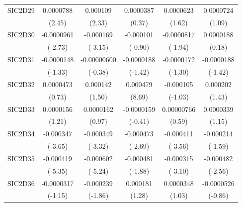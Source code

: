 \begin{table}[htbp]
\begin{tabular}{l*{5}{c}}
SIC2D29     &   0.0000788\sym{*}  &    0.000109\sym{*}  &   0.0000387         &   0.0000623         &   0.0000724         \\
            &      (2.45)         &      (2.33)         &      (0.37)         &      (1.62)         &      (1.09)         \\
SIC2D30     &  -0.0000961\sym{**} &   -0.000169\sym{**} &   -0.000101         &  -0.0000817         &   0.0000188         \\
            &     (-2.73)         &     (-3.15)         &     (-0.90)         &     (-1.94)         &      (0.18)         \\
SIC2D31     &  -0.0000148         & -0.00000600         &  -0.0000188         &  -0.0000172         &  -0.0000188         \\
            &     (-1.33)         &     (-0.38)         &     (-1.42)         &     (-1.30)         &     (-1.42)         \\
SIC2D32     &   0.0000473         &    0.000142         &    0.000479\sym{***}&   -0.000105         &    0.000202         \\
            &      (0.73)         &      (1.50)         &      (8.69)         &     (-1.03)         &      (1.43)         \\
SIC2D33     &   0.0000156         &   0.0000162         &  -0.0000159         &  0.00000766         &   0.0000339         \\
            &      (1.21)         &      (0.97)         &     (-0.41)         &      (0.59)         &      (1.15)         \\
SIC2D34     &   -0.000347\sym{***}&   -0.000349\sym{***}&   -0.000473\sym{**} &   -0.000411\sym{***}&   -0.000214         \\
            &     (-3.65)         &     (-3.32)         &     (-2.69)         &     (-3.56)         &     (-1.59)         \\
SIC2D35     &   -0.000419\sym{***}&   -0.000602\sym{***}&   -0.000481         &   -0.000315\sym{**} &   -0.000482\sym{*}  \\
            &     (-5.35)         &     (-5.24)         &     (-1.88)         &     (-3.10)         &     (-2.56)         \\
SIC2D36     &  -0.0000317         &   -0.000239         &    0.000181         &   0.0000348         &  -0.0000526         \\
            &     (-1.15)         &     (-1.86)         &      (1.28)         &      (1.03)         &     (-0.86)         \\

\end{tabular}
\end{table}
